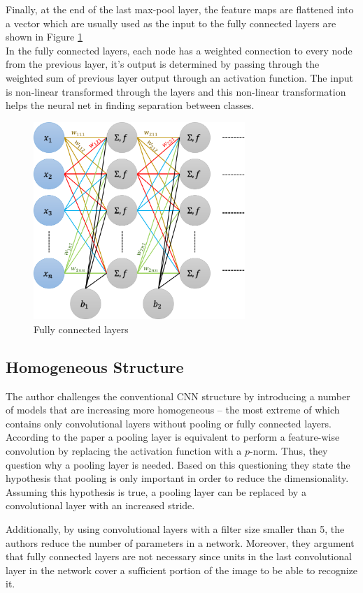 Finally, at the end of the last max-pool layer, the feature maps are flattened into a vector which are usually used as the input to the fully connected layers are shown in Figure \ref{fig:fullyconnected}\\
In the fully connected layers, each node has a weighted connection to every node from the previous layer, it's output is determined by passing through the weighted sum of previous layer output through an activation function. The input is non-linear transformed through the layers and this non-linear transformation helps the neural net in finding separation between classes.\\
\begin{figure}[hb]
	\includegraphics[width = 8cm]{img/fullyconnected.png}
    \caption{\label{fig:fullyconnected}
    Fully connected layers}
\end{figure}

\subsection{Homogeneous Structure}
The author challenges the conventional CNN structure by introducing a number of models that are increasing more homogeneous -- the most extreme of which contains only convolutional layers without pooling or fully connected layers.
According to the paper a pooling layer is equivalent to perform a feature-wise convolution by replacing the activation function with a $p$-norm. Thus, they question why a pooling layer is needed. Based on this questioning
they state the hypothesis that pooling is only important in order to reduce the dimensionality. Assuming this hypothesis is true, a pooling layer can be replaced by
a convolutional layer with an increased stride.

Additionally, by using convolutional layers with a filter size smaller than 5, the authors reduce the number of parameters in a network.
Moreover, they argument that fully connected layers are not necessary since units in the last convolutional layer in the network cover a sufficient portion of the image to be able to recognize it.
